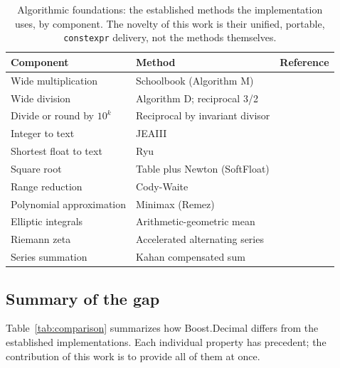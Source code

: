 \documentclass[acmsmall]{acmart}
\begin{document}
\begin{table}
  \caption{Algorithmic foundations: the established methods the implementation uses, by
    component. The novelty of this work is their unified, portable, \texttt{constexpr}
    delivery, not the methods themselves.}
  \label{tab:algorithms}
  \footnotesize
  \begin{tabular}{lll}
    \toprule
    Component & Method & Reference \\
    \midrule
    Wide multiplication       & Schoolbook (Algorithm M)         & \cite{knuth_taocp2} \\
    Wide division             & Algorithm D; reciprocal 3/2      & \cite{knuth_taocp2, moller_granlund2011} \\
    Divide or round by $10^k$ & Reciprocal by invariant divisor  & \cite{granlund_montgomery1994, warren_hd} \\
    Integer to text           & JEAIII                           & \cite{jeaiii} \\
    Shortest float to text    & Ryu                              & \cite{ryu} \\
    Square root               & Table plus Newton (SoftFloat)    & \cite{softfloat} \\
    Range reduction           & Cody-Waite                       & \cite{cody_waite1980} \\
    Polynomial approximation  & Minimax (Remez)                  & \cite{muller2016} \\
    Elliptic integrals        & Arithmetic-geometric mean        & \cite{dlmf, algorithm910} \\
    Riemann zeta              & Accelerated alternating series   & \cite{borwein1995} \\
    Series summation          & Kahan compensated sum            & \cite{kahan1965} \\
    \bottomrule
  \end{tabular}
\end{table}

\subsection{Summary of the gap}
Table~\ref{tab:comparison} summarizes how Boost.Decimal differs from the established
implementations. Each individual property has precedent; the contribution of this
work is to provide all of them at once.
\end{document}
